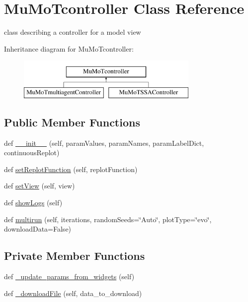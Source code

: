 \hypertarget{class_mu_mo_t_1_1_mu_mo_tcontroller}{}\section{Mu\+Mo\+Tcontroller Class Reference}
\label{class_mu_mo_t_1_1_mu_mo_tcontroller}


class describing a controller for a model view  


Inheritance diagram for Mu\+Mo\+Tcontroller\+:\begin{figure}[H]
\begin{center}
\leavevmode
\includegraphics[height=2.000000cm]{class_mu_mo_t_1_1_mu_mo_tcontroller}
\end{center}
\end{figure}
\subsection*{Public Member Functions}
\begin{DoxyCompactItemize}
\item 
def \hyperlink{class_mu_mo_t_1_1_mu_mo_tcontroller_a73251532d0348adaeafe8a178cfc6a73}{\+\_\+\+\_\+init\+\_\+\+\_\+} (self, param\+Values, param\+Names, param\+Label\+Dict, continuous\+Replot)
\item 
def \hyperlink{class_mu_mo_t_1_1_mu_mo_tcontroller_aafc1e69cab41071217fe6676a8089249}{set\+Replot\+Function} (self, replot\+Function)
\item 
def \hyperlink{class_mu_mo_t_1_1_mu_mo_tcontroller_a40e22e664ecb6e379377ee1cea60073c}{set\+View} (self, view)
\item 
def \hyperlink{class_mu_mo_t_1_1_mu_mo_tcontroller_aca4d648d909f4722c7e07197675500bb}{show\+Logs} (self)
\item 
def \hyperlink{class_mu_mo_t_1_1_mu_mo_tcontroller_aa74bfc216071ff6b768c7a584917bfc6}{multirun} (self, iterations, random\+Seeds=\char`\"{}Auto\char`\"{}, plot\+Type=\char`\"{}evo\char`\"{}, download\+Data=False)
\end{DoxyCompactItemize}
\subsection*{Private Member Functions}
\begin{DoxyCompactItemize}
\item 
def \hyperlink{class_mu_mo_t_1_1_mu_mo_tcontroller_add4eacb8e812feeca1d4b2538e3bd6e0}{\+\_\+update\+\_\+params\+\_\+from\+\_\+widgets} (self)
\item 
def \hyperlink{class_mu_mo_t_1_1_mu_mo_tcontroller_ab703aa8fe14c83d5f12fa82d4e2c42d9}{\+\_\+download\+File} (self, data\+\_\+to\+\_\+download)
\end{DoxyCompactItemize}
